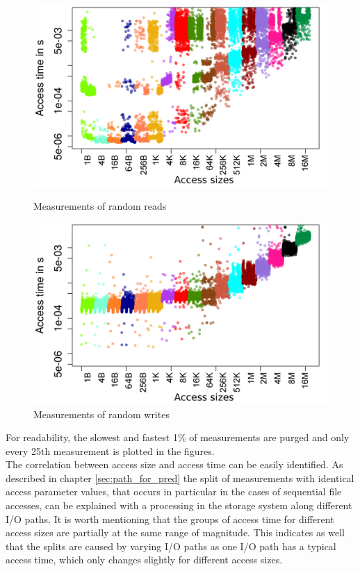 \documentclass{superfri}
\begin{document}
	\begin{figure}[b]
		\centering
		\begin{minipage}{0.47\textwidth}
			\includegraphics[width=\textwidth]{src/plot_SizeSorted_log_read_rnd.png}
			\caption{Measurements of random reads}
			\label{read_rnd}
		\end{minipage}
		\hfill
		\begin{minipage}{0.47\textwidth}
			\includegraphics[width=\textwidth]{src/plot_SizeSorted_log_write_rnd.png}
			\caption{Measurements of random writes}
			\label{write_rnd}
		\end{minipage}
	\end{figure}
	
	For readability, the slowest and fastest 1\% of measurements are purged and only every 25th measurement is plotted in the figures.\\
	The correlation between access size and access time can be easily identified.
	As described in chapter \ref{sec:path_for_pred} the split of measurements with identical access parameter values, that occurs in particular in the cases of sequential file accesses, can be explained with a processing in the storage system along different I/O paths.
	It is worth mentioning that the groups of access time for different access sizes are partially at the same range of magnitude.
	This indicates as well that the splits are caused by varying I/O paths as one I/O path has a typical access time, which only changes slightly for different access sizes.
	
\end{document}
